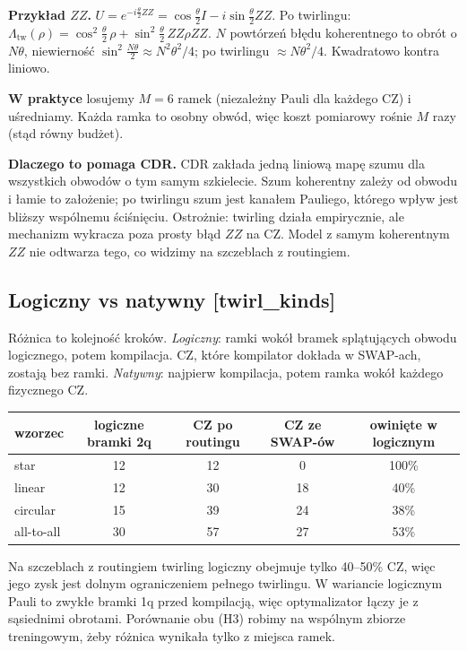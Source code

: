 \documentclass[11pt,a4paper]{article}
\newcommand{\slid}[1]{\hfill{\normalfont\small\ttfamily\color{axbluedk}[#1]}}
\begin{document}
\textbf{Przykład $ZZ$.} $U=e^{-i\frac\theta2ZZ}=\cos\frac\theta2I-i\sin\frac\theta2ZZ$. Po
twirlingu: $\Lambda_{\text{tw}}(\rho)=\cos^2\frac\theta2\,\rho+\sin^2\frac\theta2\,ZZ\rho ZZ$.
$N$ powtórzeń błędu koherentnego to obrót o $N\theta$, niewierność
$\sin^2\frac{N\theta}2\approx N^2\theta^2/4$; po twirlingu $\approx N\theta^2/4$. Kwadratowo kontra
liniowo.

\textbf{W praktyce} losujemy $M=6$ ramek (niezależny Pauli dla każdego CZ) i uśredniamy. Każda ramka
to osobny obwód, więc koszt pomiarowy rośnie $M$ razy (stąd równy budżet).

\textbf{Dlaczego to pomaga CDR.} CDR zakłada jedną liniową mapę szumu dla wszystkich obwodów o tym
samym szkielecie. Szum koherentny zależy od obwodu i łamie to założenie; po twirlingu szum jest
kanałem Pauliego, którego wpływ jest bliższy wspólnemu ściśnięciu. Ostrożnie: twirling działa
empirycznie, ale mechanizm wykracza poza prosty błąd $ZZ$ na CZ. Model z samym koherentnym $ZZ$
nie odtwarza tego, co widzimy na szczeblach z routingiem.

\subsection{Logiczny vs natywny \slid{twirl\_kinds}}

Różnica to kolejność kroków. \emph{Logiczny}: ramki wokół bramek splątujących obwodu
logicznego, potem kompilacja. CZ, które kompilator dokłada w SWAP-ach, zostają bez ramki.
\emph{Natywny}: najpierw kompilacja, potem ramka wokół każdego fizycznego CZ.

\begin{center}
\begin{tabular}{@{}lcccc@{}}
\toprule
wzorzec & logiczne bramki 2q & CZ po routingu & CZ ze SWAP-ów & owinięte w logicznym \\
\midrule
star & 12 & 12 & 0 & 100\% \\
linear & 12 & 30 & 18 & 40\% \\
circular & 15 & 39 & 24 & 38\% \\
all-to-all & 30 & 57 & 27 & 53\% \\
\bottomrule
\end{tabular}
\end{center}

Na szczeblach z routingiem twirling logiczny obejmuje tylko 40--50\% CZ, więc jego zysk jest
dolnym ograniczeniem pełnego twirlingu. W wariancie logicznym Pauli to zwykłe bramki 1q przed
kompilacją, więc optymalizator łączy je z sąsiednimi obrotami. Porównanie obu (H3) robimy na
wspólnym zbiorze treningowym, żeby różnica wynikała tylko z miejsca ramek.
\end{document}

